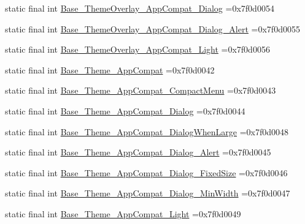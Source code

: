 \begin{DoxyCompactItemize}
\item 
static final int \mbox{\hyperlink{classbr_1_1unb_1_1cic_1_1mp_1_1marketmaster_1_1R_1_1style_a5d15951967d9b0d806676101b488c1dc}{Base\+\_\+\+Theme\+Overlay\+\_\+\+App\+Compat\+\_\+\+Dialog}} =0x7f0d0054
\item 
static final int \mbox{\hyperlink{classbr_1_1unb_1_1cic_1_1mp_1_1marketmaster_1_1R_1_1style_a5ca794487c45ee789dcc0352887071a2}{Base\+\_\+\+Theme\+Overlay\+\_\+\+App\+Compat\+\_\+\+Dialog\+\_\+\+Alert}} =0x7f0d0055
\item 
static final int \mbox{\hyperlink{classbr_1_1unb_1_1cic_1_1mp_1_1marketmaster_1_1R_1_1style_a2199baa37e08495048a1791e960f2e7e}{Base\+\_\+\+Theme\+Overlay\+\_\+\+App\+Compat\+\_\+\+Light}} =0x7f0d0056
\item 
static final int \mbox{\hyperlink{classbr_1_1unb_1_1cic_1_1mp_1_1marketmaster_1_1R_1_1style_aca11ee2fef6467172efa46a015be4e60}{Base\+\_\+\+Theme\+\_\+\+App\+Compat}} =0x7f0d0042
\item 
static final int \mbox{\hyperlink{classbr_1_1unb_1_1cic_1_1mp_1_1marketmaster_1_1R_1_1style_a35509b3c2af6b62f6554dead9d8afbcf}{Base\+\_\+\+Theme\+\_\+\+App\+Compat\+\_\+\+Compact\+Menu}} =0x7f0d0043
\item 
static final int \mbox{\hyperlink{classbr_1_1unb_1_1cic_1_1mp_1_1marketmaster_1_1R_1_1style_a1f3fd4cd3f40d01c9822c457ede0d3b9}{Base\+\_\+\+Theme\+\_\+\+App\+Compat\+\_\+\+Dialog}} =0x7f0d0044
\item 
static final int \mbox{\hyperlink{classbr_1_1unb_1_1cic_1_1mp_1_1marketmaster_1_1R_1_1style_a12ca9ed417f93529422ef3d1a2eb977b}{Base\+\_\+\+Theme\+\_\+\+App\+Compat\+\_\+\+Dialog\+When\+Large}} =0x7f0d0048
\item 
static final int \mbox{\hyperlink{classbr_1_1unb_1_1cic_1_1mp_1_1marketmaster_1_1R_1_1style_a40878c4feb31ace0f6d7ba6951f57e95}{Base\+\_\+\+Theme\+\_\+\+App\+Compat\+\_\+\+Dialog\+\_\+\+Alert}} =0x7f0d0045
\item 
static final int \mbox{\hyperlink{classbr_1_1unb_1_1cic_1_1mp_1_1marketmaster_1_1R_1_1style_a1982f4c060b25aaa514da9dd4bf44b99}{Base\+\_\+\+Theme\+\_\+\+App\+Compat\+\_\+\+Dialog\+\_\+\+Fixed\+Size}} =0x7f0d0046
\item 
static final int \mbox{\hyperlink{classbr_1_1unb_1_1cic_1_1mp_1_1marketmaster_1_1R_1_1style_af591064b5e398729fb8cc953aabb38cc}{Base\+\_\+\+Theme\+\_\+\+App\+Compat\+\_\+\+Dialog\+\_\+\+Min\+Width}} =0x7f0d0047
\item 
static final int \mbox{\hyperlink{classbr_1_1unb_1_1cic_1_1mp_1_1marketmaster_1_1R_1_1style_a95ac6b6db120f0ae1827f52ecae8e8cb}{Base\+\_\+\+Theme\+\_\+\+App\+Compat\+\_\+\+Light}} =0x7f0d0049

\end{DoxyCompactItemize}

